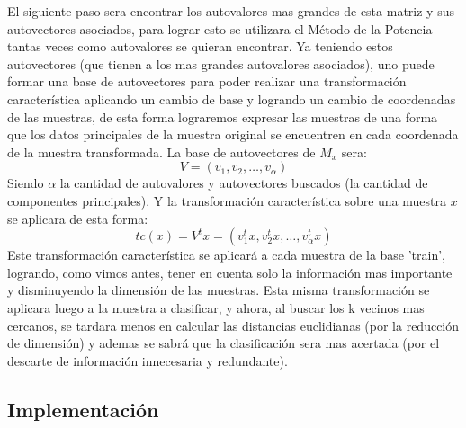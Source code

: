 \documentclass[a4paper]{article}
\begin{document}
El siguiente paso sera encontrar los autovalores mas grandes de esta matriz y sus autovectores asociados, para lograr esto se utilizara el Método de la Potencia tantas veces como autovalores se quieran encontrar. Ya teniendo estos autovectores (que tienen a los mas grandes autovalores asociados), uno puede formar una base de autovectores para poder realizar una transformación característica aplicando un cambio de base y logrando un cambio de coordenadas de las muestras, de esta forma lograremos expresar las muestras de una forma que los datos principales de la muestra original se encuentren en cada coordenada de la muestra transformada. La base de autovectores de $M_x$ sera:
$$V = (v_1,v_2,\dots,v_\alpha)$$
Siendo $\alpha$ la cantidad de autovalores y autovectores buscados (la cantidad de componentes principales). Y la transformación característica sobre una muestra $x$ se aplicara de esta forma:
$$tc(x) = V^tx = (v_1^tx,v_2^tx,\dots,v_\alpha^tx)$$
Este transformación característica se aplicará a cada muestra de la base 'train', logrando, como vimos antes, tener en cuenta solo la información mas importante y disminuyendo la dimensión de las muestras. Esta misma transformación se aplicara luego a la muestra a clasificar, y ahora, al buscar los k vecinos mas cercanos, se tardara menos en calcular las distancias euclidianas (por la reducción de dimensión) y ademas se sabrá que la clasificación sera mas acertada (por el descarte de información innecesaria y redundante).\smallbreak

\subsection{Implementación}
\end{document}
